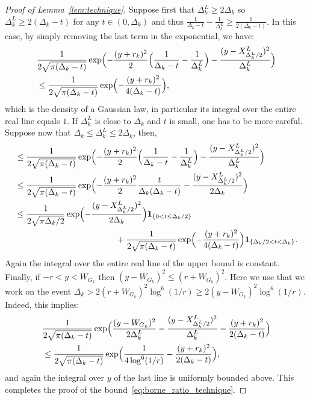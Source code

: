 \documentclass[10pt,a4paper]{amsart}
\newcommand{\ind}[1]{\mathbf{1}_{\{#1\}}}
\begin{document}
\begin{proof}[Proof of Lemma~\ref{lem:technique}]
Suppose first that $\Delta^L_k \geq 2 \Delta_k$ so $\Delta^L_k \geq 2 (\Delta_k-t)$ for any $t \in (0, \Delta_k)$ and thus $\frac{1}{\Delta_k-t}-\frac{1}{\Delta^L_k} \geq \frac{1}{2(\Delta_k-t)}$. In this case, by simply removing the last term in the exponential, we have:
\begin{align*}
&\frac{1}{2\sqrt{\pi(\Delta_k-t)}} \exp\Bigl(- \frac{(y+r_{k})^2}{2} \Bigl(\frac{1}{\Delta_k-t}-\frac{1}{\Delta^L_k}\Bigr) - \frac{(y-X^L_{\Delta^L_k/2})^2}{\Delta^L_k}\Bigr)
\\
&\leq \frac{1}{2\sqrt{\pi(\Delta_k-t)}} \exp\Bigl(- \frac{(y+r_{k})^2}{4(\Delta_k-t)}\Bigr)
,\end{align*}
which is the density of a Gaussian law, in particular its integral over the entire real line equals $1$. If $\Delta^L_k$ is close to $\Delta_k$ and $t$ is small, one has to be more careful.
Suppose now that $\Delta_k \leq \Delta^L_k \leq 2 \Delta_k$, then,
\begin{align*}
&\leq \frac{1}{2\sqrt{\pi(\Delta_k-t)}} \exp\Bigl(- \frac{(y+r_{k})^2}{2} \Bigl(\frac{1}{\Delta_k-t}-\frac{1}{\Delta^L_k}\Bigr) - \frac{(y-X^L_{\Delta^L_k/2})^2}{\Delta^L_k}\Bigr)
\\
&\leq \frac{1}{2\sqrt{\pi(\Delta_k-t)}} \exp\Bigl(- \frac{(y+r_{k})^2}{2} \frac{t}{\Delta_k(\Delta_k-t)} - \frac{(y-X^L_{\Delta^L_k/2})^2}{2\Delta_k}\Bigr)
\\
&\leq \frac{1}{2\sqrt{\pi \Delta_k / 2}} \exp\Bigl(- \frac{(y-X^L_{\Delta^L_k/2})^2}{2 \Delta_k}\Bigr) \ind{0 < t \leq \Delta_k/2}\\
& \qquad \qquad \qquad \qquad \qquad  \qquad + \frac{1}{2\sqrt{\pi(\Delta_k-t)}} \exp\Bigl(- \frac{(y+r_{k})^2}{4 (\Delta_k-t)}\Bigr) \ind{\Delta_k/2 < t < \Delta_k}
.\end{align*}
Again the integral over the entire real line of the upper bound is constant.
Finally, if $-r < y < W_{G_k}$ then $(y-W_{G_k})^2 \leq (r+W_{G_k})^2$. Here we use that we work on the event $\Delta_k > 2(r+W_{G_k})^2 \log^6(1/r) \geq 2 (y-W_{G_k})^2 \log^6(1/r)$. Indeed, this implies:
\begin{align*}
&\frac{1}{2\sqrt{\pi(\Delta_k-t)}} \exp\Bigl(\frac{(y-W_{G_k})^2}{2\Delta^L_k} - \frac{(y-X^L_{\Delta^L_k/2})^2}{\Delta^L_k} - \frac{(y+r_{k})^2}{2(\Delta_k-t)}\Bigr)
\\
&\leq \frac{1}{2\sqrt{\pi(\Delta_k-t)}} \exp\Bigl(\frac{1}{4\log^6(1/r)} - \frac{(y+r_{k})^2}{2(\Delta_k-t)}\Bigr)
,\end{align*}
and again the integral over $y$ of the last line is uniformly bounded above.
This completes the proof of the bound~\eqref{eq:borne_ratio_technique}.



\end{proof}
\end{document}
